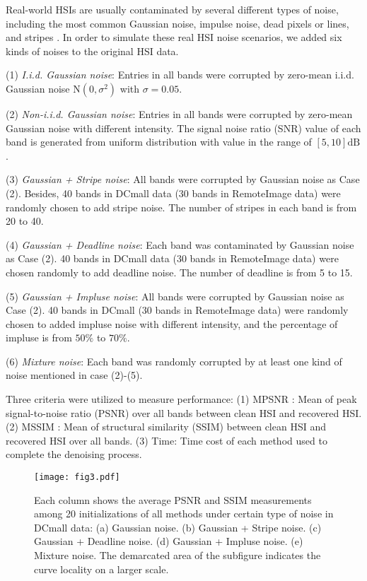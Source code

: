 \documentclass[journal]{IEEEtran}
\begin{document}
Real-world HSIs are usually contaminated by several different types of noise, including the most common Gaussian noise, impulse noise, dead pixels or lines, and stripes \cite{zhang2014hyperspectral}. In order to simulate these real HSI noise scenarios, we added six kinds of noises to the original HSI data.

(1) \textit{I.i.d. Gaussian noise}: Entries in all bands were corrupted by zero-mean i.i.d. Gaussian noise $ \mathrm{N}(0,\sigma^2) $ with $ \sigma = 0.05 $.

(2) \textit{Non-i.i.d. Gaussian noise}: Entries in all bands were corrupted by zero-mean Gaussian noise with different intensity. The signal noise ratio (SNR) value of each band is generated from uniform distribution with value in the range of  $ [5,10]\mathrm{dB} $.

(3) \textit{Gaussian + Stripe noise}: All bands were corrupted by Gaussian noise as Case (2). Besides, 40 bands in DCmall data (30 bands in RemoteImage data) were randomly chosen to add stripe noise. The number of stripes in each band is from 20 to 40.

(4) \textit{Gaussian + Deadline noise}: Each band was contaminated by Gaussian noise as Case (2). 40 bands in DCmall data (30 bands in RemoteImage data) were chosen randomly to add deadline noise. The number of deadline is from 5 to 15.

(5) \textit{Gaussian + Impluse noise}: All bands were corrupted by Gaussian noise as Case (2). 40 bands in DCmall (30 bands in RemoteImage data) were randomly chosen to added impluse noise with different intensity, and the percentage of impluse is from $ 50 \% $ to $ 70 \% $.

(6) \textit{Mixture noise}: Each band was randomly corrupted by at least one kind of  noise mentioned in case (2)-(5).
		
Three criteria were utilized to measure performance: (1) MPSNR \cite{huynh2008scope}: Mean of peak signal-to-noise ratio (PSNR) over all bands between clean HSI and recovered HSI. (2) MSSIM \cite{wang2004image}: Mean of structural similarity (SSIM) between clean HSI and recovered HSI over all bands. (3) Time: Time cost of each method  used to complete the denoising process.


\begin{figure*}[t]
	\centering
	\texttt{[image: fig3.pdf]}\vspace{-3mm}
	\caption{Each column shows the average PSNR and SSIM measurements among  20 initializations of all methods under certain type of noise in DCmall data: (a) Gaussian noise. (b) Gaussian + Stripe noise. (c) Gaussian + Deadline noise. (d) Gaussian + Impluse noise. (e) Mixture noise. The demarcated area of the subfigure indicates the curve locality on a larger scale. \label{DC_PSNR} }
\end{figure*}
\end{document}
